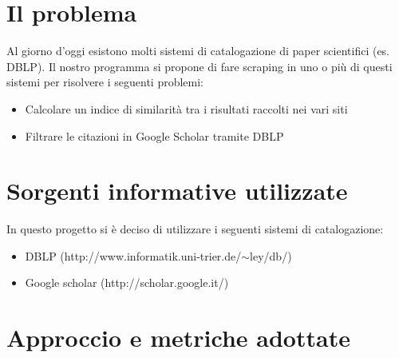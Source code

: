 \documentclass[12pt]{article}
\begin{document}
\maketitle

\section{Il problema}
Al giorno d'oggi esistono molti sistemi di catalogazione di paper scientifici (es. DBLP). Il nostro programma si propone di fare scraping in uno o pi\`u di questi sistemi per risolvere i seguenti problemi:
\begin{itemize}
\item Calcolare un indice di similarit\`a tra i risultati raccolti nei vari siti
\item Filtrare le citazioni in Google Scholar tramite DBLP
\end{itemize}

\section{Sorgenti informative utilizzate}
In questo progetto si \`e deciso di utilizzare i seguenti sistemi di catalogazione:
\begin{itemize}
\item DBLP (http://www.informatik.uni-trier.de/$\sim$ley/db/)
\item Google scholar (http://scholar.google.it/)
\end{itemize}

\section{Approccio e metriche adottate}
\end{document}
